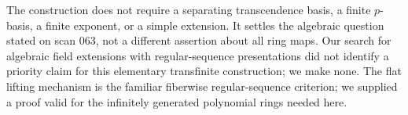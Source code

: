 \begin{remark}\label{SA23-B2-3}
The construction does not require a separating transcendence basis,
a finite $p$-basis, a finite exponent, or a simple extension.  It settles
the algebraic question stated on scan 063, not a different assertion
about all ring maps.  Our search for algebraic field extensions with
regular-sequence presentations did not identify a priority claim for
this elementary transfinite construction; we make none.  The flat
lifting mechanism is the familiar fiberwise regular-sequence criterion;
we supplied a proof valid for the infinitely generated polynomial rings
needed here.
\end{remark}
